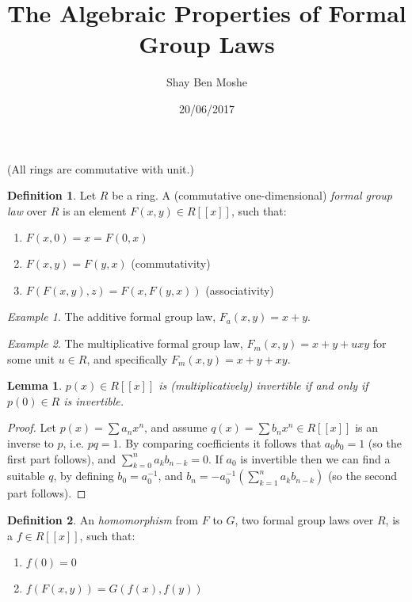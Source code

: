 \documentclass{article}
\title{The Algebraic Properties of Formal Group Laws}
\author{Shay Ben Moshe}
\date{20/06/2017}
\newtheorem*{lemma*}{Lemma}
\theoremstyle{definition}
\newtheorem*{definition*}{Definition}
\theoremstyle{remark}
\newtheorem*{example*}{Example}
\begin{document}
	\maketitle
	
	(All rings are commutative with unit.)
	
	\begin{definition*}
		Let $R$ be a ring.
		A (commutative one-dimensional) \emph{formal group law} over $R$ is an element $F\left(x,y\right) \in R\left[\left[x\right]\right]$, such that:
		\begin{enumerate}
			\item $F\left(x,0\right) = x = F\left(0,x\right)$
			\item $F\left(x,y\right)=F\left(y,x\right)$ (commutativity) 
			\item $F\left(F\left(x,y\right),z\right)=F\left(x,F\left(y,x\right)\right)$ (associativity)
		\end{enumerate}
	\end{definition*}

	\begin{example*}
		The additive formal group law, $F_a\left(x,y\right) = x+y$.
	\end{example*}

	\begin{example*}
		The multiplicative formal group law, $F_m\left(x,y\right) = x+y+uxy$ for some unit $u\in R$, and specifically $F_m\left(x,y\right) = x+y+xy$.
	\end{example*}

	\begin{lemma*}
		$p\left(x\right) \in R\left[\left[x\right]\right]$ is (multiplicatively) invertible if and only if $p\left(0\right) \in R$ is invertible.
	\end{lemma*}
	\begin{proof}
		Let $p\left(x\right) = \sum a_n x^n$, and assume $q\left(x\right) = \sum b_n x^n \in R\left[\left[x\right]\right]$ is an inverse to $p$, i.e. $pq = 1$. 
		By comparing coefficients it follows that $a_0 b_0 = 1$ (so the first part follows), and $\sum_{k=0}^n a_k b_{n-k} = 0$.
		If $a_0$ is invertible then we can find a suitable $q$, by defining $b_0 = a_0^{-1}$, and $b_n = - a_0^{-1} \left(\sum_{k=1}^n a_k b_{n-k}\right)$ (so the second part follows).
	\end{proof}

	\begin{definition*}
		An \emph{homomorphism} from $F$ to $G$, two formal group laws over $R$, is a $f \in R\left[\left[x\right]\right]$, such that:
		\begin{enumerate}
			\item $f\left(0\right) = 0$
			\item $f\left(F\left(x,y\right)\right) = G\left(f\left(x\right),f\left(y\right)\right)$
		\end{enumerate}
	\end{definition*}
\end{document}
